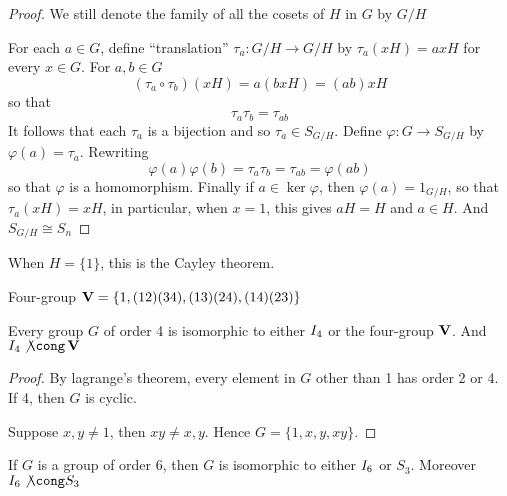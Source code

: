 \documentclass[11pt]{article}
\begin{document}
\begin{proof}
We still denote the family of all the cosets of \(H\) in \(G\) by \(G/H\)

For each \(a\in G\), define ``translation'' \(\tau_a:G/H\to G/H\) by \(\tau_a(xH)=axH\)
for every \(x\in G\). For \(a,b\in G\)
\begin{equation*}
(\tau_a\circ\tau_b)(xH)=a(bxH)=(ab)xH
\end{equation*}
so that 
\begin{equation*}
\tau_a\tau_b=\tau_{ab}
\end{equation*}
It follows that each \(\tau_a\) is a bijection and so \(\tau_a\in S_{G/H}\). Define
\(\varphi:G\to S_{G/H}\) by \(\varphi(a)=\tau_a\). Rewriting
\begin{equation*}
\varphi(a)\varphi(b)=\tau_a\tau_b=\tau_{ab}=\varphi(ab)
\end{equation*}
so that \(\varphi\) is a homomorphism. Finally if \(a\in\ker\varphi\), then
\(\varphi(a)=1_{G/H}\), so that \(\tau_a(xH)=xH\), in particular, when \(x=1\), this
gives \(aH=H\) and \(a\in H\). And \(S_{G/H}\cong S_n\)
\end{proof}

When \(H=\{1\}\), this is the Cayley theorem.

Four-group \(\operatorname{\textbf{V}}=\{1,(1 2)(3 4),(1 3)(2 4), (1 4)(2 3)\}\)
\begin{proposition}[]
Every group \(G\) of order 4 is isomorphic to either \(\relax{I}_4\) or the four-group
\(\operatorname{\textbf{V}}\). And \(\I_4\not\cong\bV\)
\end{proposition}

\begin{proof}
By lagrange's theorem, every element in \(G\) other than 1 has order 2 or 4. If
4, then \(G\) is cyclic.

Suppose \(x,y\neq 1\), then \(xy\neq x,y\). Hence \(G=\{1,x,y,xy\}\).
\end{proof}


\begin{proposition}[]
If \(G\) is a group of order 6, then \(G\) is isomorphic to either \(\relax{I}_6\) or
\(S_3\). Moreover \(\I_6\not\cong S_3\)
\end{proposition}
\end{document}
